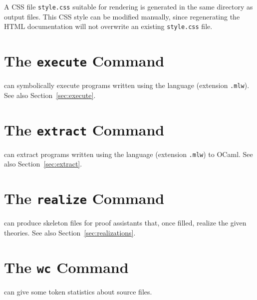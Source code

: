 A CSS file \verb|style.css| suitable for rendering is generated in the
same directory as output files. This CSS style can be modified manually,
since regenerating the HTML documentation will not overwrite an existing
\verb|style.css| file.

\section{The \texttt{execute} Command}
\label{sec:why3execute}

\why can symbolically execute programs written using the \whyml language
(extension \texttt{.mlw}). See also Section~\ref{sec:execute}.

\section{The \texttt{extract} Command}
\label{sec:why3extract}

\why can extract programs written using the \whyml language
(extension \texttt{.mlw}) to OCaml. See also Section~\ref{sec:extract}.

\section{The \texttt{realize} Command}
\label{sec:why3realize}

\why can produce skeleton files for proof assistants that, once filled,
realize the given theories. See also Section~\ref{sec:realizations}.

\section{The \texttt{wc} Command}
\label{sec:why3wc}

\why can give some token statistics about \whyml source files.

